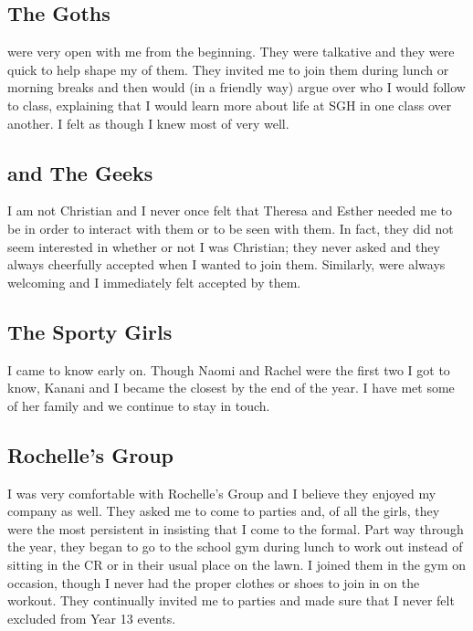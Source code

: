 
\subsection{The Goths}
 were very open with me from the beginning. They were talkative and they were quick to help shape my  of them. They invited me to join them during lunch or morning breaks and then would (in a friendly way) argue over who I would follow to class, explaining that I would learn more about life at SGH in one class over another. I felt as though I knew most of  very well.
 
\subsection{ and The Geeks} 
I am not Christian and I never once felt that Theresa and Esther needed me to be in order to interact with them or to be seen with them. In fact, they did not seem interested in whether or not I was Christian; they never asked and they always cheerfully accepted when I wanted to join them. Similarly,  were always welcoming and I immediately felt accepted by them. 

\subsection{The Sporty Girls}
I came to know  early on. Though Naomi and Rachel were the first two I got to know, Kanani and I became the closest by the end of the year. I have met some of her family and we continue to stay in touch.

\subsection{Rochelle's Group}
I was very comfortable with Rochelle's Group and I believe they enjoyed my company as well. They asked me to come to parties and, of all the girls, they were the most persistent in insisting that I come to the formal. Part way through the year, they began to go to the school gym during lunch to work out instead of sitting in the CR or in their usual place on the lawn. I joined them in the gym on occasion, though I never had the proper clothes or shoes to join in on the workout. They continually invited me to parties and made sure that I never felt excluded from Year 13 events.

